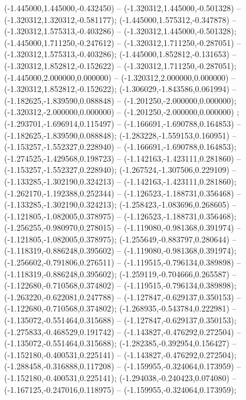  (-1.445000,1.445000,-0.432450) -- (-1.320312,1.445000,-0.501328) -- (-1.320312,1.320312,-0.581177);
 (-1.445000,1.575312,-0.347878) -- (-1.320312,1.575313,-0.403286) -- (-1.320312,1.445000,-0.501328);
 (-1.445000,1.711250,-0.247612) -- (-1.320312,1.711250,-0.287051) -- (-1.320312,1.575313,-0.403286);
 (-1.445000,1.852812,-0.131653) -- (-1.320312,1.852812,-0.152622) -- (-1.320312,1.711250,-0.287051);
 (-1.445000,2.000000,0.000000) -- (-1.320312,2.000000,0.000000) -- (-1.320312,1.852812,-0.152622);
 (-1.306029,-1.843586,0.061994) -- (-1.182625,-1.839590,0.088848) -- (-1.201250,-2.000000,0.000000);
 (-1.320312,-2.000000,0.000000) -- (-1.201250,-2.000000,0.000000) ;
 (-1.293701,-1.696914,0.115497) -- (-1.166691,-1.690788,0.164853) -- (-1.182625,-1.839590,0.088848);
 (-1.283228,-1.559153,0.160951) -- (-1.153257,-1.552327,0.228940) -- (-1.166691,-1.690788,0.164853);
 (-1.274525,-1.429568,0.198723) -- (-1.142163,-1.423111,0.281860) -- (-1.153257,-1.552327,0.228940);
 (-1.267524,-1.307506,0.229109) -- (-1.133285,-1.302190,0.324213) -- (-1.142163,-1.423111,0.281860);
 (-1.262170,-1.192388,0.252344) -- (-1.126523,-1.188731,0.356468) -- (-1.133285,-1.302190,0.324213);
 (-1.258423,-1.083696,0.268605) -- (-1.121805,-1.082005,0.378975) -- (-1.126523,-1.188731,0.356468);
 (-1.256255,-0.980970,0.278015) -- (-1.119080,-0.981368,0.391974) -- (-1.121805,-1.082005,0.378975);
 (-1.255649,-0.883797,0.280644) -- (-1.118319,-0.886248,0.395602) -- (-1.119080,-0.981368,0.391974);
 (-1.256602,-0.791806,0.276511) -- (-1.119515,-0.796134,0.389898) -- (-1.118319,-0.886248,0.395602);
 (-1.259119,-0.704666,0.265587) -- (-1.122680,-0.710568,0.374802) -- (-1.119515,-0.796134,0.389898);
 (-1.263220,-0.622081,0.247788) -- (-1.127847,-0.629137,0.350153) -- (-1.122680,-0.710568,0.374802);
 (-1.268935,-0.543784,0.222981) -- (-1.135072,-0.551464,0.315688) -- (-1.127847,-0.629137,0.350153);
 (-1.275833,-0.468529,0.191742) -- (-1.143827,-0.476292,0.272504) -- (-1.135072,-0.551464,0.315688);
 (-1.282385,-0.392954,0.156427) -- (-1.152180,-0.400531,0.225141) -- (-1.143827,-0.476292,0.272504);
 (-1.288458,-0.316888,0.117208) -- (-1.159955,-0.324064,0.173959) -- (-1.152180,-0.400531,0.225141);
 (-1.294038,-0.240423,0.074080) -- (-1.167125,-0.247016,0.118975) -- (-1.159955,-0.324064,0.173959);
